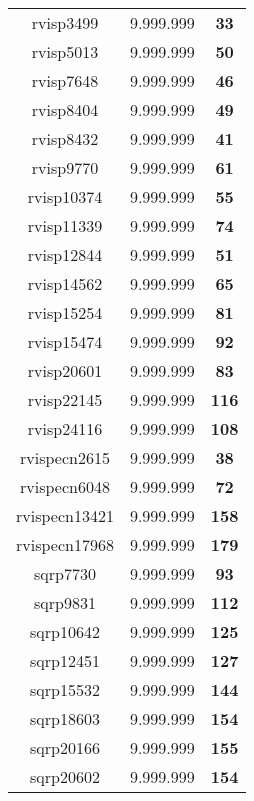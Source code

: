 \begin{tabular}{cc||c}
rvisp3499        & 9.999.999        & {\bf 33}        \\ 
rvisp5013        & 9.999.999        & {\bf 50}        \\ 
rvisp7648        & 9.999.999        & {\bf 46}        \\ 
rvisp8404        & 9.999.999        & {\bf 49}        \\ 
rvisp8432        & 9.999.999        & {\bf 41}        \\ 
rvisp9770        & 9.999.999        & {\bf 61}        \\ 
rvisp10374       & 9.999.999        & {\bf 55}        \\ 
rvisp11339       & 9.999.999        & {\bf 74}        \\ 
rvisp12844       & 9.999.999        & {\bf 51}        \\ 
rvisp14562       & 9.999.999        & {\bf 65}        \\ 
rvisp15254       & 9.999.999        & {\bf 81}        \\ 
rvisp15474       & 9.999.999        & {\bf 92}        \\ 
rvisp20601       & 9.999.999        & {\bf 83}        \\ 
rvisp22145       & 9.999.999        & {\bf 116}       \\ 
rvisp24116       & 9.999.999        & {\bf 108}       \\ 
rvispecn2615     & 9.999.999        & {\bf 38}        \\ 
rvispecn6048     & 9.999.999        & {\bf 72}        \\ 
rvispecn13421    & 9.999.999        & {\bf 158}       \\ 
rvispecn17968    & 9.999.999        & {\bf 179}       \\ 
sqrp7730         & 9.999.999        & {\bf 93}        \\ 
sqrp9831         & 9.999.999        & {\bf 112}       \\ 
sqrp10642        & 9.999.999        & {\bf 125}       \\ 
sqrp12451        & 9.999.999        & {\bf 127}       \\ 
sqrp15532        & 9.999.999        & {\bf 144}       \\ 
sqrp18603        & 9.999.999        & {\bf 154}       \\ 
sqrp20166        & 9.999.999        & {\bf 155}       \\ 
sqrp20602        & 9.999.999        & {\bf 154}       \\ 

\end{tabular}
